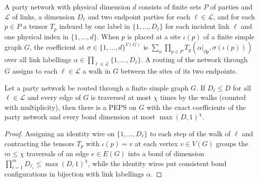 \begin{definition}
    \label{def:peps_party_network_routing}
    \leanok
    A party network with physical dimension $d$ consists of finite sets $P$ of
    parties and $\mathcal L$ of links, a dimension $D_\ell$ and two endpoint
    parties for each $\ell\in\mathcal L$, and for each $p\in P$ a tensor $T_p$ indexed by one label in $\{1,\dots,D_\ell\}$ for each incident link $\ell$ and one physical index in $\{1,\dots,d\}$. When $p$ is placed at a site $\iota(p)$ of a finite simple graph $G$, the
    coefficient at $\sigma\in\{1,\dots,d\}^{V(G)}$ is $\sum_\alpha\prod_{p\in P} T_p(\alpha|_{\partial p},\sigma(\iota(p)))$ over all link
    labellings $\alpha\in\prod_{\ell\in\mathcal L}\{1,\dots,D_\ell\}$. A routing of the network through $G$ assigns to each
    $\ell\in\mathcal L$ a walk in $G$ between the sites of its two endpoints.
\end{definition}

\begin{lemma}
    \label{thm:peps_routed_contraction}
    \leanok
    Let a party network be routed through a finite simple graph $G$. If $D_\ell\le D$ for all $\ell\in\mathcal L$ and every edge of $G$ is traversed at most $\chi$
    times by the walks (counted with multiplicity), then there is a PEPS on $G$ with
    the exact coefficients of the party network and every bond dimension at
    most ${\max(D,1)}^\chi$.
\end{lemma}

\begin{proof}\leanok
    Assigning an identity wire on $\{1,\dots,D_\ell\}$ to each step of the walk of $\ell$ and contracting the tensors $T_p$ with $\iota(p)=v$ at each vertex $v\in V(G)$ groups the $m\le\chi$ traversals of an edge $e\in E(G)$ into a bond of dimension $\prod_{i=1}^m D_{\ell_i}\le {\max(D,1)}^\chi$, while the identity wires put consistent bond configurations in bijection with link labellings $\alpha$.
\end{proof}

